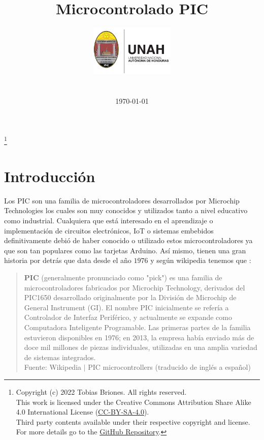 \documentclass[conference]{IEEEtran}
\title{Microcontrolado PIC}
\author{
    \includegraphics[width = 40mm]{images/logo-unah.png}\\[8ex]
    \IEEEauthorblockN{Tobias Briones}
    \IEEEauthorblockN{tobias.briones@unah.hn}
    \IEEEauthorblockN{Cuenta: 20152030017}
    \IEEEauthorblockA{\textit{Universidad Nacional Autónoma de Honduras} \\
    \textit{Ingeniería de Sistemas} \\
    \textit{I PAC 2022} \\
    \textit{IS911-MICROPROCESADORES}} \\\vspace*{20pt} \normalsize  \\
    \today
}
\newcommand\blfootnote[1]{%
    \begingroup
    \renewcommand\thefootnote{}\footnote{#1}%
    \addtocounter{footnote}{-1}%
    \endgroup
}
\begin{document}
    \maketitle

    \begin{abstract}
    \end{abstract}

    \tableofcontents

    \blfootnote{
        Copyright (c) 2022 Tobias Briones. All rights reserved. \\
        This work is licensed under the Creative Commons Attribution Share Alike 4.0 International License (\href{https://spdx.org/licenses/CC-BY-SA-4.0}{CC-BY-SA-4.0}). \\
        Third party contents available under their respective copyright and license.\\
        For more details go to the \href{https://github.com/tobiasbriones/cp-unah-is911-microprocessors}{GitHub Repository}.}

    \section{Introducción}

    Los PIC son una familia de microcontroladores desarrollados por Microchip Technologies \cite{microchip-technology-inc-2013} los cuales son muy conocidos y utilizados tanto a nivel educativo como industrial. Cualquiera que está interesado en el aprendizaje o implementación de circuitos electrónicos, IoT o sistemas embebidos definitivamente debió de haber conocido o utilizado estos microcontroladores ya que son tan populares como las tarjetas Arduino. Así mismo, tienen una gran historia por detrás que data desde el año $1976$ y según wikipedia tenemos que \cite{wikipedia-pic-2022}:

    \bigbreak

    \begin{quote}
        \textbf{PIC} (generalmente pronunciado como "pick") es una familia de microcontroladores fabricados por Microchip Technology, derivados del PIC1650 desarrollado originalmente por la División de Microchip de General Instrument (GI). El nombre PIC inicialmente se refería a Controlador de Interfaz Periférico, y actualmente se expande como Computadora Inteligente Programable. Las primeras partes de la familia estuvieron disponibles en 1976; en 2013, la empresa había enviado más de doce mil millones de piezas individuales, utilizadas en una amplia variedad de sistemas integrados.
        \\
        \small Fuente: Wikipedia $\mid$ PIC microcontrollers (traducido de inglés a español) \cite{wikipedia-pic-2022}
    \end{quote}
\end{document}
